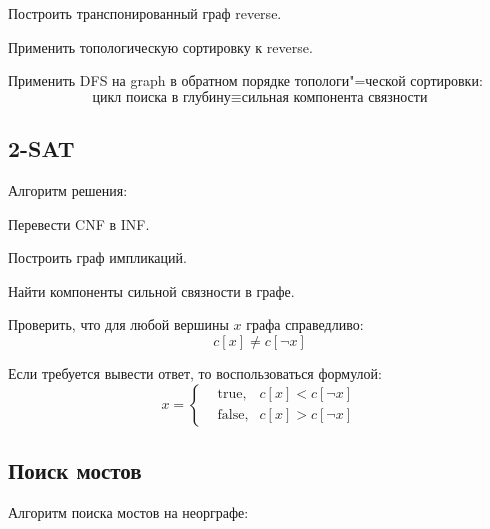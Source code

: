 \begin{list*}[][\#]
\item Построить {\ital транспонированный} граф {\ital reverse}.
\item Применить {\ital топологическую сортировку} к {\ital reverse}.
\item Применить {\ital DFS} на {\ital graph} в обратном порядке топологи"=ческой сортировки:
$$\text{цикл поиска в глубину}\equiv\text{сильная компонента связности}$$
\end{list*}

\subsection{2-SAT}

{\bold Алгоритм} решения:

\begin{list*}[][\#]
\item Перевести CNF в INF.
\item Построить граф импликаций.
\item Найти компоненты сильной связности в графе.
\item Проверить, что для любой вершины $x$ графа справедливо:
$$c[x]\neq c[\lnot x]$$
\item Если требуется вывести ответ, то воспользоваться формулой:
$$x=\left\{\begin{aligned}
&\text{true}, &c[x]\less c[\lnot x]\\
&\text{false}, &c[x]\greater c[\lnot x]
\end{aligned}\right.$$
\end{list*}

\subsection{Поиск мостов}

{\bold Алгоритм} поиска мостов на неорграфе:


